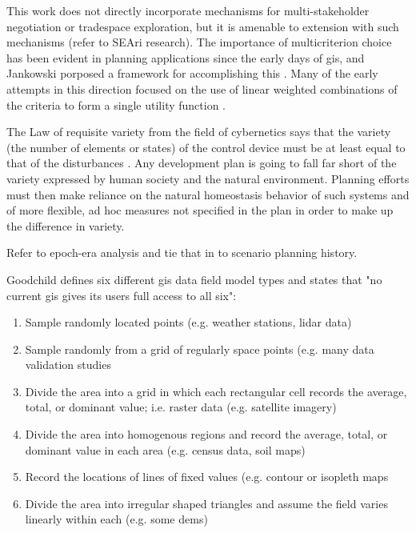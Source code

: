 This work does not directly incorporate mechanisms for multi-stakeholder negotiation or tradespace exploration, but it is amenable to extension with such mechanisms (refer to SEAri research). The importance of multicriterion choice has been evident in planning applications since the early days of \ac{gis}, and Jankowski porposed a framework for accomplishing this \cite{jankowskiIntegratingGeographicalInformation1995}. Many of the early attempts in this direction focused on the use of linear weighted combinations of the criteria to form a single utility function \cite{malczewskiGISbasedApproachMultiple1996}.	

The Law of requisite variety from the field of cybernetics says that the variety (the number of elements or states) of the control device must be at least equal to that of the disturbances \cite{ashbyRequisiteVarietyIts1991}. Any development plan is going to fall far short of the variety expressed by human society and the natural environment. Planning efforts must then make reliance on the natural homeostasis behavior of such systems and of more flexible, ad hoc measures not specified in the plan in order to make up the difference in variety. \cite{mcloughlinSystemGuidanceControl1972}

Refer to epoch-era analysis and tie that in to scenario planning history.

Goodchild defines six different \ac{gis} data field model types and states that "no current \ac{gis} gives its users full access to all six":

\begin{enumerate}
    \setlength{\itemsep}{0pt}%
    \setlength{\parskip}{0pt}%
	\item{Sample randomly located points (e.g. weather stations, \ac{lidar} data)}
	\item{Sample randomly from a grid of regularly space points (e.g. many data validation studies}
	\item{Divide the area into a grid in which each rectangular cell records the average, total, or dominant value; i.e. raster data (e.g. satellite imagery)}
	\item{Divide the area into homogenous regions and record the average, total, or dominant value in each area (e.g. census data, soil maps)}
	\item{Record the locations of lines of fixed values (e.g. contour or isopleth maps}
	\item{Divide the area into irregular shaped triangles and assume the field varies linearly within each (e.g. some \acp{dem})}
\end{enumerate}

